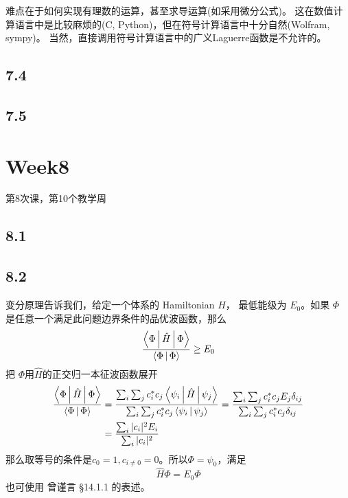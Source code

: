 难点在于如何实现有理数的运算，甚至求导运算(如采用微分公式)。
这在数值计算语言中是比较麻烦的(C, Python)，但在符号计算语言中十分自然(Wolfram, sympy)。
当然，直接调用符号计算语言中的广义Laguerre函数是不允许的。

\subsection{7.4}

\subsection{7.5}

\section{Week8}
第8次课，第10个教学周
\subsection{8.1}
\subsection{8.2}
变分原理告诉我们，给定一个体系的 Hamiltonian $\hat H$，%
最低能级为 $E_0$。如果 $\Phi$ 是任意一个满足此问题边界条件的品优波函数，那么
\begin{equation}
	\dfrac{\Braket{ \Phi | \hat H | \Phi }}{\Braket{ \Phi | \Phi }} \geq E_0
\end{equation}
把 $ \Phi $用$\hat H$的正交归一本征波函数展开
\begin{align}\label{key}
	\dfrac{\Braket{ \Phi | \hat H | \Phi }}{\Braket{ \Phi | \Phi }} &= \dfrac{\sum_i\sum_j c_i^* c_j \Braket{\psi_i | \hat H | \psi_j}}{\sum_i\sum_j c_i^* c_j \Braket{\psi_i |  \psi_j}} 
	= \dfrac{\sum_i\sum_j c_i^* c_j E_j \delta_{ij}}{\sum_i \sum_j c_i^* c_j \delta_{ij}} \notag\\
	&= \dfrac{ \sum_i |c_i|^2 E_i }{\sum_i  |c_i|^2} 
\end{align}
那么取等号的条件是$ c_0 = 1, c_{i\neq 0} = 0$。所以$ \Phi = \psi_0 $，满足
\begin{equation}\label{key}
	\hat H \Phi = E_0 \Phi
\end{equation}
也可使用 曾谨言 \S 14.1.1 的表述。


